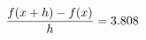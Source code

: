 \documentclass[preview]{standalone}
\begin{document}
\begin{align*}
\special{dvisvgm:raw <g id='unique000'>}\frac{f(x+h)-f(x)}{h} = 3.808\special{dvisvgm:raw </g>}
\end{align*}
\end{document}
